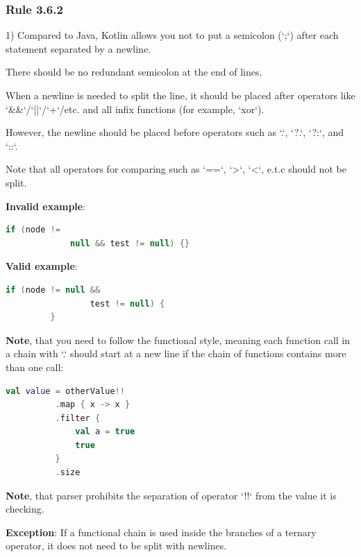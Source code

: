 {\subsubsection*{\textbf{Rule 3.6.2}}
\leavevmode\newline



1) Compared to Java, Kotlin allows you not to put a semicolon (`;`) after each statement separated by a newline.

    There should be no redundant semicolon at the end of lines.

 

When a newline is needed to split the line, it should be placed after operators like `\&\&`/`||`/`+`/etc. and all infix functions (for example, `xor`).

However, the newline should be placed before operators such as `.`, `?.`, `?:`, and `::`.



Note that all operators for comparing such as `==`, `>`, `<`, e.t.c should not be split.



\textbf{Invalid example}: 

\begin{lstlisting}[language=Kotlin]
     if (node !=
             null && test != null) {}
\end{lstlisting}
 

\textbf{Valid example}: 

\begin{lstlisting}[language=Kotlin]
         if (node != null && 
                 test != null) {
         }
\end{lstlisting}
  

\textbf{Note}, that you need to follow the functional style, meaning each function call in a chain with `.` should start at a new line if the chain of functions contains more than one call:

\begin{lstlisting}[language=Kotlin]
  val value = otherValue!!
          .map { x -> x }
          .filter {
              val a = true
              true
          }
          .size    
\end{lstlisting}
\textbf{Note}, that parser prohibits the separation of operator `!!` from the value it is checking.



\textbf{Exception}: If a functional chain is used inside the branches of a ternary operator, it does not need to be split with newlines.



}
